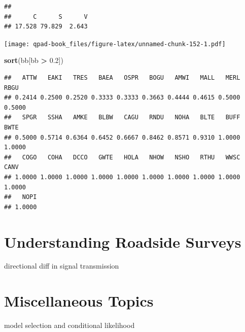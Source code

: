 \documentclass[12pt,]{book}
\newenvironment{Shaded}{\begin{snugshade}}{\end{snugshade}}
\newcommand{\FloatTok}[1]{\textcolor[rgb]{0.00,0.00,0.81}{#1}}
\newcommand{\KeywordTok}[1]{\textcolor[rgb]{0.13,0.29,0.53}{\textbf{#1}}}
\newcommand{\NormalTok}[1]{#1}
\newcommand{\OperatorTok}[1]{\textcolor[rgb]{0.81,0.36,0.00}{\textbf{#1}}}
\newcommand{\StringTok}[1]{\textcolor[rgb]{0.31,0.60,0.02}{#1}}
\begin{document}
\begin{verbatim}
## 
##      C      S      V 
## 17.528 79.829  2.643
\end{verbatim}

\begin{Shaded}
\end{Shaded}

\texttt{[image: qpad-book\_files/figure-latex/unnamed-chunk-152-1.pdf]}

\begin{Shaded}
\begin{Highlighting}[]
\KeywordTok{sort}\NormalTok{(bb[bb }\OperatorTok{>}\StringTok{ }\FloatTok{0.2}\NormalTok{])}
\end{Highlighting}
\end{Shaded}

\begin{verbatim}
##   ATTW   EAKI   TRES   BAEA   OSPR   BOGU   AMWI   MALL   MERL   RBGU 
## 0.2414 0.2500 0.2520 0.3333 0.3333 0.3663 0.4444 0.4615 0.5000 0.5000 
##   SPGR   SSHA   AMKE   BLBW   CAGU   RNDU   NOHA   BLTE   BUFF   BWTE 
## 0.5000 0.5714 0.6364 0.6452 0.6667 0.8462 0.8571 0.9310 1.0000 1.0000 
##   COGO   COHA   DCCO   GWTE   HOLA   NHOW   NSHO   RTHU   WWSC   CANV 
## 1.0000 1.0000 1.0000 1.0000 1.0000 1.0000 1.0000 1.0000 1.0000 1.0000 
##   NOPI 
## 1.0000
\end{verbatim}

\hypertarget{roadsides}{%
\chapter{Understanding Roadside Surveys}\label{roadsides}}

directional diff in signal transmission

\hypertarget{extras}{%
\chapter{Miscellaneous Topics}\label{extras}}

model selection and conditional likelihood
\end{document}

